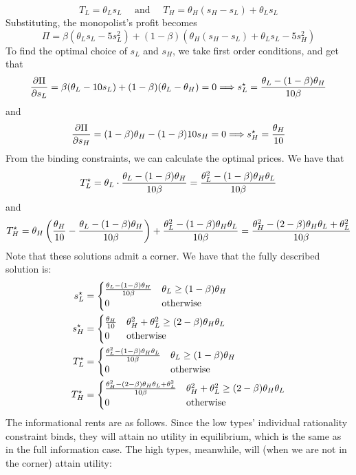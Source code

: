 \documentclass[12pt]{article}
\begin{document}
\begin{enumerate}
\begin{enumerate}
		\[
		T_L = \theta_Ls_L \quad \text{ and } \quad T_H = \theta_H(s_H - s_L) + \theta_Ls_L
		\]
		Substituting, the monopolist's profit becomes
		\[
		\Pi = \beta(\theta_Ls_L - 5s_L^2) + (1-\beta)(\theta_H(s_H - s_L) + \theta_Ls_L - 5s_H^2)
		\]
		To find the optimal choice of $s_L$ and $s_H$, we take first order conditions, and get that
		\[
		\frac{\partial \Pi}{\partial s_L} = \beta (\theta_L - 10s_L) + (1-\beta)(\theta_L - \theta_H) = 0 \Longrightarrow s_L^\star = \frac{\theta_L - (1-\beta)\theta_H}{10\beta}
		\]
		and
		\[
		\frac{\partial \Pi}{\partial s_H} = (1-\beta)\theta_H - (1-\beta)10s_H = 0 \Longrightarrow s_H^\star = \frac{\theta_H}{10}
		\]
		From the binding constraints, we can calculate the optimal prices. We have that
		\[
		T_L^\star = \theta_L \cdot \frac{\theta_L - (1-\beta)\theta_H}{10\beta} = \frac{\theta_L^2 - (1-\beta)\theta_H\theta_L}{10\beta}
		\]
		and
		\[
		T_H^\star = \theta_H \left( \frac{\theta_H}{10} - \frac{\theta_L - (1-\beta)\theta_H}{10\beta}\right) + \frac{\theta_L^2 - (1-\beta)\theta_H\theta_L}{10\beta} = \frac{\theta_H^2 - (2-\beta)\theta_H\theta_L + \theta_L^2}{10\beta}
		\]
		Note that these solutions admit a corner. We have that the fully described solution is:
		\begin{align*}
		s_L^\star &= \begin{cases} \frac{\theta_L - (1-\beta)\theta_H}{10\beta} &\theta_L \ge (1-\beta)\theta_H \\ 0 & \text{otherwise} \end{cases} \\
		s_H^\star &= \begin{cases} \frac{\theta_H}{10} & \theta_H^2 + \theta_L^2 \ge (2-\beta)\theta_H\theta_L \\ 0 & \text{otherwise} \end{cases} \\
		T_L^\star &= \begin{cases} \frac{\theta_L^2 - (1-\beta)\theta_H\theta_L}{10\beta} &  \theta_L \ge (1-\beta)\theta_H \\ 0 & \text{otherwise}\end{cases} \\
		T_H^\star &= \begin{cases} \frac{\theta_H^2 - (2-\beta)\theta_H\theta_L + \theta_L^2}{10\beta}& \theta_H^2 + \theta_L^2 \ge (2-\beta)\theta_H\theta_L \\ 0 & \text{otherwise} \end{cases}
		\end{align*}
		The informational rents are as follows. Since the low types' individual rationality constraint binds, they will attain no utility in equilibrium, which is the same as in the full information case. The high types, meanwhile, will (when we are not in the corner) attain utility:

\end{enumerate}
\end{enumerate}
\end{document}

